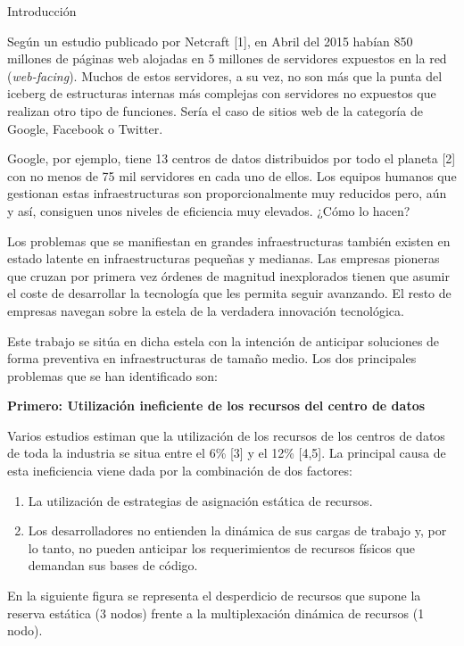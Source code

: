 \documentclass[a4paper,12pt,spanish,final]{epsc_tfc_pfc}
\begin{document}

\begin{intro}{Introducción}

  Según un estudio publicado por Netcraft [1], en Abril del 2015 habían 850 millones de páginas web alojadas en 5 millones de servidores expuestos en la red (\emph{web-facing}). Muchos de estos servidores, a su vez, no son más que la punta del iceberg de estructuras internas más complejas con servidores no expuestos que realizan otro tipo de funciones. Sería el caso de sitios web de la categoría de Google, Facebook o Twitter.

  Google, por ejemplo, tiene 13 centros de datos distribuidos por todo el planeta [2] con no menos de 75 mil servidores en cada uno de ellos. Los equipos humanos que gestionan estas infraestructuras son proporcionalmente muy reducidos pero, aún y así, consiguen unos niveles de eficiencia muy elevados. ¿Cómo lo hacen?

Los problemas que se manifiestan en grandes infraestructuras también existen en estado latente en infraestructuras pequeñas y medianas. Las empresas pioneras que cruzan por primera vez órdenes de magnitud inexplorados tienen que asumir el coste de desarrollar la tecnología que les permita seguir avanzando. El resto de empresas navegan sobre la estela de la verdadera innovación tecnológica.

Este trabajo se sitúa en dicha estela con la intención de anticipar soluciones de forma preventiva en infraestructuras de tamaño medio. Los dos principales problemas que se han identificado son:

\textbf{Primero: Utilización ineficiente de los recursos del centro de datos}

Varios estudios estiman que la utilización de los recursos de los centros de datos de toda la industria se situa entre el 6\% [3] y el 12\% [4,5]. La principal causa de esta ineficiencia viene dada por la combinación de dos factores:
\begin{enumerate}
  \item La utilización de estrategias de asignación estática de recursos.
  \item Los desarrolladores no entienden la dinámica de sus cargas de trabajo y, por lo tanto, no pueden anticipar los requerimientos de recursos físicos que demandan sus bases de código.
\end{enumerate}

En la siguiente figura se representa el desperdicio de recursos que supone la reserva estática (3 nodos) frente a la multiplexación dinámica de recursos (1 nodo).


\end{intro}
\end{document}
